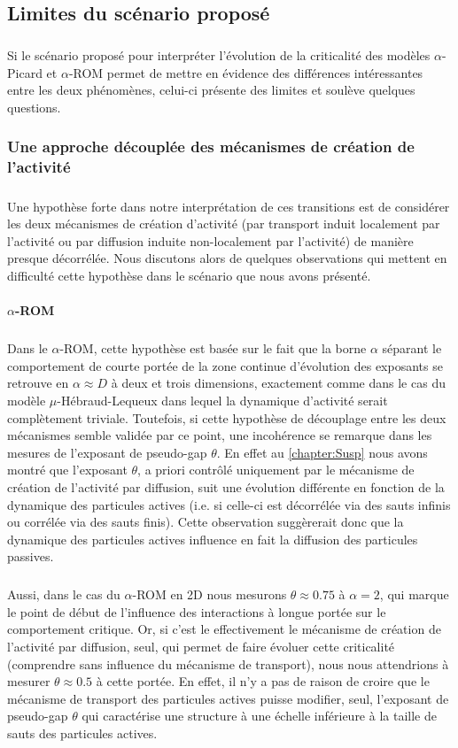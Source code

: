 \subsection{Limites du scénario proposé}

\subparagraph{}Si le scénario proposé pour interpréter l'évolution de la criticalité des modèles $\alpha$-Picard et $\alpha$-ROM permet de mettre en évidence des différences intéressantes entre les deux phénomènes, celui-ci présente des limites et soulève quelques questions.

\subsubsection{Une approche découplée des mécanismes de création de l'activité}

\subparagraph{}Une hypothèse forte dans notre interprétation de ces transitions est de considérer les deux mécanismes de création d'activité (par transport induit localement par l'activité ou par diffusion induite non-localement par l'activité) de manière presque décorrélée. Nous discutons alors de quelques observations qui mettent en difficulté cette hypothèse dans le scénario que nous avons présenté.

\paragraph{$\alpha$-ROM}

\subparagraph{}Dans le $\alpha$-ROM, cette hypothèse est basée sur le fait que la borne $\alpha$ séparant le comportement de courte portée de la zone continue d'évolution des exposants se retrouve en $\alpha \approx D$ à deux et trois dimensions, exactement comme dans le cas du modèle $\mu$-Hébraud-Lequeux dans lequel la dynamique d'activité serait complètement triviale. Toutefois, si cette hypothèse de découplage entre les deux mécanismes semble validée par ce point, une incohérence se remarque dans les mesures de l'exposant de pseudo-gap $\theta$. En effet au \autoref{chapter:Susp} nous avons montré que l'exposant $\theta$, a priori contrôlé uniquement par le mécanisme de création de l'activité par diffusion, suit une évolution différente en fonction de la dynamique des particules actives (i.e. si celle-ci est décorrélée via des sauts infinis ou corrélée via des sauts finis). Cette observation suggèrerait donc que la dynamique des particules actives influence en fait la diffusion des particules passives. 

\subparagraph{}Aussi, dans le cas du $\alpha$-ROM en 2D nous mesurons $\theta \approx 0.75$ à $\alpha = 2$, qui marque le point de début de l'influence des interactions à longue portée sur le comportement critique. Or, si c'est le effectivement le mécanisme de création de l'activité par diffusion, seul,  qui permet de faire évoluer cette criticalité (comprendre sans influence du mécanisme de transport), nous nous attendrions à mesurer $\theta \approx 0.5$ à cette portée. En effet, il n'y a pas de raison de croire que le mécanisme de transport des particules actives puisse modifier, seul, l'exposant de pseudo-gap $\theta$ qui caractérise une structure à une échelle inférieure à la taille de sauts des particules actives.

